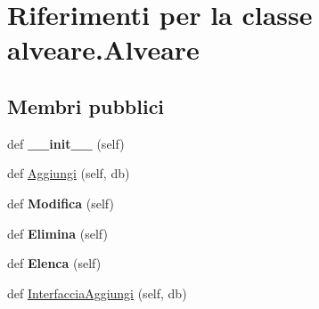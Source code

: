 \hypertarget{classalveare_1_1Alveare}{}\section{Riferimenti per la classe alveare.\+Alveare}
\label{classalveare_1_1Alveare}
\subsection*{Membri pubblici}
\begin{DoxyCompactItemize}
\item 
def {\bfseries \+\_\+\+\_\+init\+\_\+\+\_\+} (self)\hypertarget{classalveare_1_1Alveare_a0e989be377f682b42c586be0b4b7d3dc}{}\label{classalveare_1_1Alveare_a0e989be377f682b42c586be0b4b7d3dc}

\item 
def \hyperlink{classalveare_1_1Alveare_ab96add517787f0990d1a31229b84023e}{Aggiungi} (self, db)
\item 
def {\bfseries Modifica} (self)\hypertarget{classalveare_1_1Alveare_a7ea9f3467476139259dc47d40018c9e2}{}\label{classalveare_1_1Alveare_a7ea9f3467476139259dc47d40018c9e2}

\item 
def {\bfseries Elimina} (self)\hypertarget{classalveare_1_1Alveare_a8ed154d75e12163c8ba2ad6432f3813c}{}\label{classalveare_1_1Alveare_a8ed154d75e12163c8ba2ad6432f3813c}

\item 
def {\bfseries Elenca} (self)\hypertarget{classalveare_1_1Alveare_a2782499540f2e234cf33423f3f05d99d}{}\label{classalveare_1_1Alveare_a2782499540f2e234cf33423f3f05d99d}

\item 
def \hyperlink{classalveare_1_1Alveare_abf2c97ac838ed0af2326ee4cd4742820}{Interfaccia\+Aggiungi} (self, db)
\end{DoxyCompactItemize}
